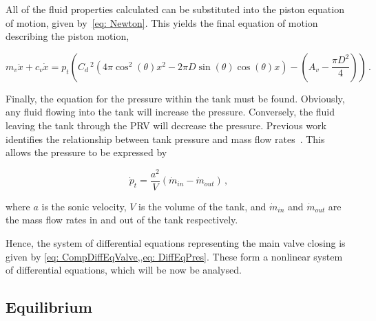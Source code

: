 All of the fluid properties calculated can be substituted into the piston equation of motion, given by~\cref{eq: Newton}. This yields the final equation of motion describing the piston motion,

\begin{equation} \label{eq: CompDiffEqValve}
    m_v \ddot{x} + c_v \dot{x} = p_t \left(
    C_d \,^2 \left( 4 \pi \cos^2(\theta) x^2
    - 2 \pi D \sin(\theta) \cos(\theta) x \right)
    - \left( A_v - \frac{\pi D^2}{4} \right)
    \right) \, .
\end{equation}

Finally, the equation for the pressure within the tank must be found. Obviously, any fluid flowing into the tank will increase the pressure. Conversely, the fluid leaving the tank through the PRV will decrease the pressure. Previous work identifies the relationship between tank pressure and mass flow rates~\cite{Hos2015DynamicModelling}. This allows the pressure to be expressed by

\begin{equation} \label{eq: DiffEqPres}
    \dot{p}_t = \frac{a^2}{V} \left( \dot{m}_{in} - \dot{m}_{out} \right) \, ,
\end{equation}

where $a$ is the sonic velocity, $V$ is the volume of the tank, and $\dot{m}_{in}$ and $\dot{m}_{out}$ are the mass flow rates in and out of the tank respectively.

Hence, the system of differential equations representing the main valve closing is given by \cref{eq: CompDiffEqValve,,eq: DiffEqPres}. These form a nonlinear system of differential equations, which will be now be analysed.

\subsection{Equilibrium}




